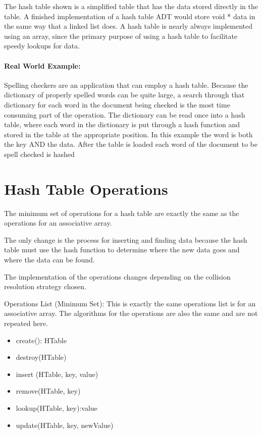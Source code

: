 The hash table shown is a simplified table that has the data stored directly in the table.  A finished implementation of a hash table ADT would store void * data in the same way that a linked list does.   A hash table is nearly always implemented using an array, since the primary purpose of using a hash table to facilitate speedy lookups for data.

\paragraph{Real World Example:}
 
Spelling checkers are an application that can employ a hash table.   Because the dictionary of properly spelled words can be quite large,   a search through that dictionary for each word in the document being checked is the most time consuming part of the operation.   The dictionary can be read once into a hash table, where each word in the dictionary is put through a hash function and stored in the table at the appropriate position.  In this example the word is both the key AND the data.
After the table is loaded each word of the document to be spell checked is hashed

\section{Hash Table Operations}
The minimum set of operations for a hash table are exactly the same as the operations for an associative array.
     
The only change is the process for inserting and finding data because the hash table must use the hash function to determine where the new data goes and where the data can be found.
   
The implementation of the operations changes depending on the collision resolution strategy chosen.

Operations List (Minimum Set):  
This is exactly the same operations list is for an associative array.   The algorithms for the operations are also the same and are not repeated here.
\begin{itemize}
\item create(): HTable
\item destroy(HTable)
\item insert (HTable, key, value)
\item remove(HTable, key)
\item lookup(HTable, key):value
\item update(HTable, key, newValue)
\end{itemize}


